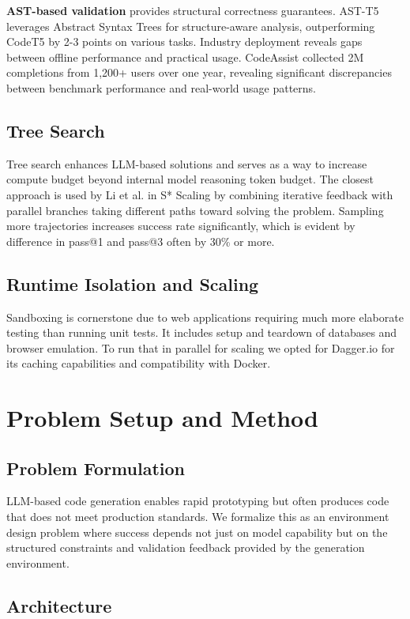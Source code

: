 \documentclass{article}
\begin{document}
\textbf{AST-based validation} provides structural correctness guarantees. AST-T5 leverages Abstract Syntax Trees for structure-aware analysis, outperforming CodeT5 by 2-3 points on various tasks. Industry deployment reveals gaps between offline performance and practical usage. CodeAssist collected 2M completions from 1,200+ users over one year, revealing significant discrepancies between benchmark performance and real-world usage patterns.

\subsection{Tree Search}

Tree search enhances LLM-based solutions and serves as a way to increase compute budget beyond internal model reasoning token budget. The closest approach is used by Li et al. in S* Scaling \citep{li2025s} by combining iterative feedback with parallel branches taking different paths toward solving the problem. Sampling more trajectories increases success rate significantly, which is evident by difference in pass@1 and pass@3 often by 30\% or more.

 \subsection{Runtime Isolation and Scaling}
Sandboxing is cornerstone due to web applications requiring much more elaborate testing than running unit tests. It includes setup and teardown of databases and browser emulation. To run that in parallel for scaling we opted for Dagger.io for its caching capabilities and compatibility with Docker.

\section{Problem Setup and Method}

\subsection{Problem Formulation}

LLM-based code generation enables rapid prototyping but often produces code that does not meet production standards. We formalize this as an environment design problem where success depends not just on model capability but on the structured constraints and validation feedback provided by the generation environment.

\subsection{Architecture}
\end{document}
